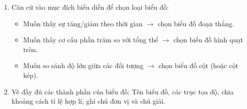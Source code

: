 \begin{enumerate}
\item Căn cứ vào mục đích biểu diễn để chọn loại biểu đồ:
\begin{itemize}
\item Muốn thấy sự tăng/giảm theo thời gian $\rightarrow$ chọn biểu đồ đoạn thẳng.
\item Muốn thấy cơ cấu phần trăm so với tổng thể $\rightarrow$ chọn biểu đồ hình quạt tròn.
\item Muốn so sánh độ lớn giữa các đối tượng $\rightarrow$ chọn biểu đồ cột (hoặc cột kép).
\end{itemize}
\item Vẽ đầy đủ các thành phần của biểu đồ: Tên biểu đồ, các trục tọa độ, chia khoảng cách tỉ lệ hợp lí, ghi chú đơn vị và chú giải.
\end{enumerate}
